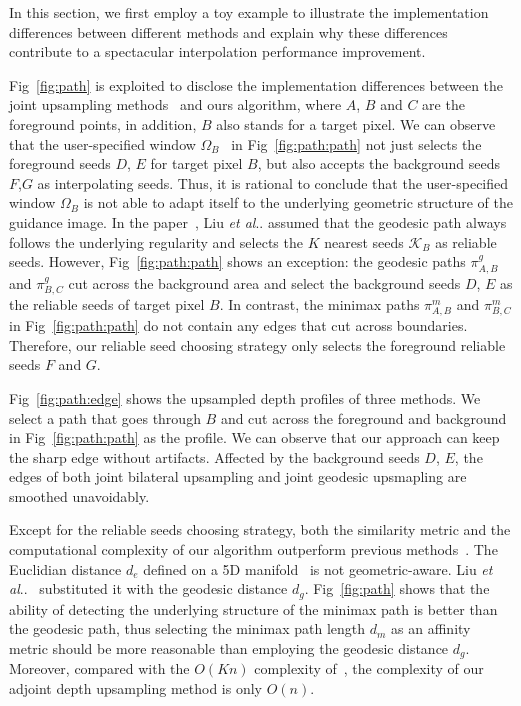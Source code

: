 \documentclass[preprint,10pt,5p,times,twocolumn]{elsarticle}
\makeatletter
\DeclareRobustCommand\onedot{\futurelet\@let@token\@onedot}
\def\@onedot{\ifx\@let@token.\else.\null\fi\xspace}
\def\etal{\emph{et al}\onedot}
\makeatother
\begin{document}
In this section, we first employ a toy example to illustrate the implementation differences between different methods and explain why these differences contribute to a spectacular interpolation performance improvement.

Fig~\ref{fig:path} is exploited to disclose the implementation differences between the joint upsampling methods~\cite{Liu2013,Kopf2007} and ours algorithm, where $A$, $B$ and $C$ are the foreground points, in addition, $B$ also stands for a target pixel. We can observe that the user-specified window $\Omega_B$~\cite{Kopf2007} in Fig~\ref{fig:path:path} not just selects the foreground seeds $D$, $E$ for target pixel $B$, but also accepts the background seeds $F$,$G$ as interpolating seeds. Thus, it is rational to conclude that the user-specified window $\Omega_B$ is not able to adapt  itself to the underlying geometric structure of the guidance image. In the paper~\cite{Liu2013}, Liu \etal assumed that the geodesic path always follows the underlying regularity and selects the $K$ nearest seeds $\mathcal{K}_B$ as reliable seeds. However, Fig~\ref{fig:path:path} shows an exception: the geodesic paths $\pi^g_{A,B}$ and $\pi^g_{B,C}$ cut across the background area and select the background seeds $D$, $E$ as the reliable seeds of target pixel $B$. In contrast, the minimax paths $\pi^m_{A,B}$ and $\pi^m_{B,C}$ in Fig~\ref{fig:path:path} do not contain any edges that cut across boundaries. Therefore, our reliable seed choosing strategy only selects the foreground reliable seeds $F$ and $G$.





Fig~\ref{fig:path:edge} shows the upsampled depth profiles of three methods. We select a path that goes through $B$ and cut across the foreground and background in Fig~\ref{fig:path:path} as the profile. We can observe that our approach can keep the sharp edge without artifacts. Affected by the background seeds $D$, $E$, the edges of both joint bilateral upsampling and joint geodesic upsmapling are smoothed unavoidably.

Except for the reliable seeds choosing strategy, both the similarity metric and the computational complexity of our algorithm outperform previous methods~\cite{Liu2013,Kopf2007}. The Euclidian distance $d_e$ defined on a 5D manifold~\cite{Barash2002} is not geometric-aware. Liu \etal~\cite{Liu2013} substituted it with the geodesic distance $d_g$. Fig~\ref{fig:path} shows that the ability of detecting the underlying structure of the minimax path is better than the geodesic path, thus selecting the minimax path length $d_m$ as an affinity metric should be more reasonable than employing the geodesic distance $d_g$. Moreover, compared with the $O(Kn)$ complexity of~\cite{Liu2013,Kopf2007}, the complexity of our adjoint depth upsampling method is only $O(n)$.
\end{document}
